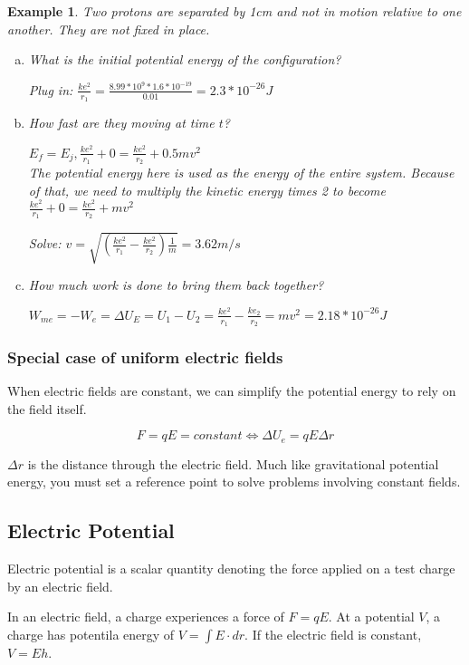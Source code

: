 \documentclass{article}
\newtheorem{example}{Example}
\begin{document}
\begin{example}
	Two protons are separated by 1cm and not in motion relative to one another. They are not fixed in place.
	\begin{enumerate}[a)]
		\item What is the initial potential energy of the configuration?

			Plug in: $ \frac{k e^2}{r_1}=\frac{8.99*10^9*1.6*10^{-19}}{0.01}=2.3*10^{-26} J$
		\item How fast are they moving at time $t$?

			$E_f=E_j, \frac{ke^2}{r_1}+0=\frac{ke^2}{r_2}+0.5 m v^2$
			\\The potential energy here is used as the energy of the entire system. Because of that, we need to multiply the kinetic energy times 2 to become $\frac{ke^2}{r_1}+0=\frac{ke^2}{r_2}+m v^2$

			Solve:
			$v=\sqrt{(\frac{ke^2}{r_1}-\frac{ke^2}{r_2})\frac{1}{m}}=3.62 m/s$
		\item How much work is done to bring them back together?

			$W_{me}=-W_e=\Delta U_E=U_1-U_2=\frac{ke^2}{r_1}-\frac{ke_2}{r_2}=mv^2=2.18*10^{-26} J$
	\end{enumerate}
\end{example}
\subsubsection{Special case of uniform electric fields}
When electric fields are constant, we can simplify the potential energy to rely on the field itself.

\begin{equation} F=qE=constant \iff \Delta U_e= q E\Delta r \end{equation}

	$\Delta r$ is the distance through the electric field. Much like gravitational potential energy, you must set a reference point to solve problems involving constant fields. 

\subsection{Electric Potential}

Electric potential is a scalar quantity denoting the force applied on a test charge by an electric field.

In an electric field, a charge experiences a force of $F=q E$. At a potential $V$, a charge has potentila energy of $V=\int{E \cdot dr}$. If the electric field is constant, $V=Eh$.
\end{document}
